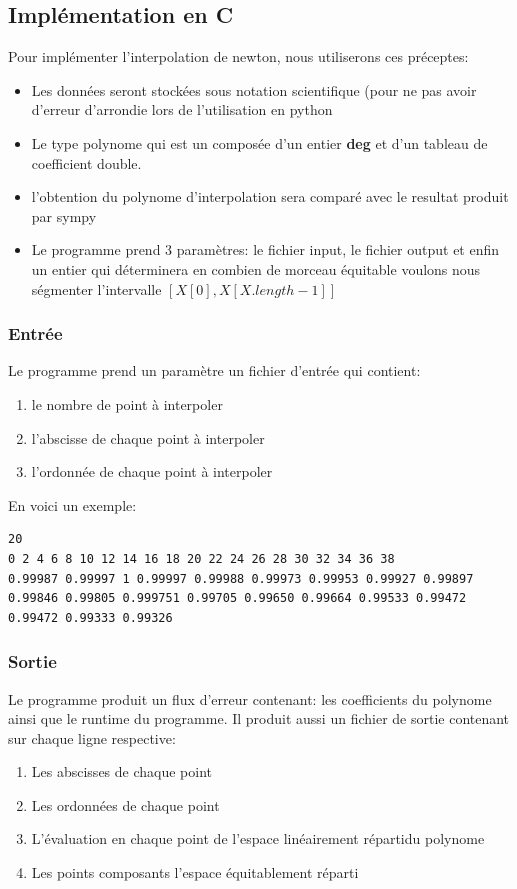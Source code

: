 \subsection{Implémentation en C}
Pour implémenter l'interpolation de newton, nous utiliserons ces préceptes:
\begin{itemize}
\item Les données seront stockées sous notation scientifique (pour ne pas avoir d'erreur d'arrondie lors de l'utilisation en python
\item Le type polynome qui est un composée d'un entier \textbf{deg} et d'un tableau de coefficient double.
\item l'obtention du polynome d'interpolation sera comparé avec le resultat produit par sympy
\item Le programme prend 3 paramètres: le fichier input, le fichier output et enfin un entier qui déterminera en combien de morceau équitable voulons nous ségmenter l'intervalle $[X[0], X[X.length-1]]$ 
\end{itemize}
\subsubsection{Entrée}
Le programme prend un paramètre un fichier d'entrée qui contient:
\begin{enumerate}
\item le nombre de point à interpoler
\item l'abscisse de chaque point à interpoler
\item l'ordonnée de chaque point à interpoler
\end{enumerate}
En voici un exemple: 
\begin{lstlisting}[mathescape=true, frame=single, basicstyle=\linespread{1.5}\fontsize{8}{10}\selectfont, caption="41.txt"]
20
0 2 4 6 8 10 12 14 16 18 20 22 24 26 28 30 32 34 36 38
0.99987 0.99997 1 0.99997 0.99988 0.99973 0.99953 0.99927 0.99897 
0.99846 0.99805 0.999751 0.99705 0.99650 0.99664 0.99533 0.99472 
0.99472 0.99333 0.99326
\end{lstlisting}
\subsubsection{Sortie}
Le programme produit un flux d'erreur contenant: les coefficients du polynome ainsi que le runtime du programme.
Il produit aussi un fichier de sortie contenant sur chaque ligne respective:
\begin{enumerate}
\item Les abscisses de chaque point
\item Les ordonnées de chaque point
\item L'évaluation en chaque point de l'espace linéairement répartidu polynome 
\item Les points composants l'espace équitablement réparti
\end{enumerate}
\newpage
